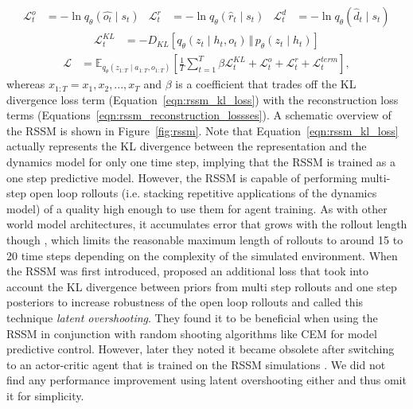 \documentclass{article}
\DeclareMathOperator{\cond}{\vert}
\begin{document}
\begin{align}\label{eqn:rssm_reconstruction_lossses}
    \mathcal{L}_t^{o} & = - \ln q_\theta(\hat{o_t} \cond s_t) & \mathcal{L}_t^{r} & = - \ln q_\theta(\hat{r}_t \cond s_t) & \mathcal{L}_t^{d} & = - \ln q_\theta(\hat{d}_t \cond s_t) 
\end{align}
\begin{align}\label{eqn:rssm_kl_loss}
    \mathcal{L}_t^{KL} & = - D_{KL}\left[ q_\theta(z_t \cond h_t, o_t) \,\Vert\, p_\theta(z_t \cond h_t) \right]
\end{align}
\begin{align}
    \mathcal{L} &= \mathbb{E}_{q_\theta(z_{1:T} \cond a_{1:T}, o_{1:T})} \left[ \frac{1}{T} \sum_{t=1}^T \beta \mathcal{L}_t^{KL} + \mathcal{L}_t^{o} +  \mathcal{L}_t^{r} +  \mathcal{L}_t^{term} \right],
\end{align}
whereas $x_{1:T} = x_1, x_2, ..., x_T$ and $\beta$ is a coefficient that trades off the KL divergence loss term (Equation~\ref{eqn:rssm_kl_loss}) with the reconstruction loss terms (Equations~\ref{eqn:rssm_reconstruction_lossses}). 
A schematic overview of the RSSM is shown in Figure~\ref{fig:rssm}.
Note that Equation~\ref{eqn:rssm_kl_loss} actually represents the KL divergence between the representation and the dynamics model for only one time step, implying that the RSSM is trained as a one step predictive model.
However, the RSSM is capable of performing multi-step open loop rollouts (i.e. stacking repetitive applications of the dynamics model) of a quality high enough to use them for agent training. 
As with other world model architectures, it accumulates error that grows with the rollout length though \citet{nagabandi2017neural, hafner2019learning, hafner2020dream, janner2021trust}, which limits the reasonable maximum length of rollouts to around 15 to 20 time steps depending on the complexity of the simulated environment.
When the RSSM was first introduced, \citet{hafner2019learning} proposed an additional loss that took into account the KL divergence between priors from multi step rollouts and one step posteriors to increase robustness of the open loop rollouts and called this technique \textit{latent overshooting}. 
They found it to be beneficial when using the RSSM in conjunction with random shooting algorithms like CEM for model predictive control. 
However, later they noted it became obsolete after switching to an actor-critic agent that is trained on the RSSM simulations \citep{hafner2020dream}. 
We did not find any performance improvement using latent overshooting either and thus omit it for simplicity.
\end{document}
